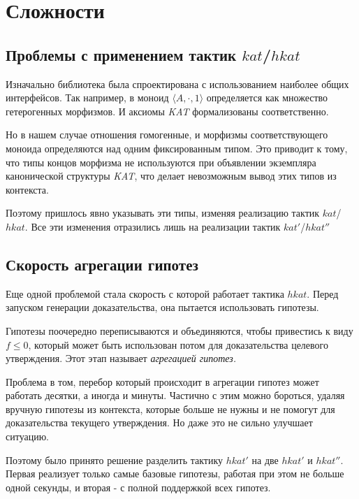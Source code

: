 \documentclass[times
              ]{itmo-student-thesis}
\begin{document}
  \section{Сложности}
    \subsection{Проблемы с применением тактик $kat$/$hkat$}
      Изначально библиотека была спроектирована с использованием наиболее общих интерфейсов.
      Так например, в моноид $ \langle A, \cdot, 1 \rangle $ определяется как множество гетерогенных морфизмов. И аксиомы \textit{KAT} формализованы соответственно.


      Но в нашем случае отношения гомогенные, и морфизмы соответствующего моноида определяются над одним фиксированным типом.
      Это приводит к тому, что типы концов морфизма не используются при объявлении экземпляра канонической структуры \textit{KAT},
      что делает невозможным вывод этих типов из контекста.

      Поэтому пришлось явно указывать эти типы, изменяя реализацию тактик $ kat $/$ hkat $.
      Все эти изменения отразились лишь на реализации тактик $ kat' $/$ hkat'' $

    \subsection{Скорость агрегации гипотез}

      Еще одной проблемой стала скорость с которой работает тактика $ hkat $.
      Перед запуском генерации доказательства, она пытается использовать гипотезы.

      Гипотезы поочередно переписываются и объединяются, чтобы привестись к виду $ f \leq 0 $, который может быть использован потом для доказательства целевого утверждения.
      Этот этап называет \textit{агрегацией гипотез.}

      Проблема в том, перебор который происходит в агрегации гипотез может работать десятки, а иногда и минуты.
      Частично с этим можно бороться, удаляя вручную гипотезы из контекста, которые больше не нужны и не помогут для доказательства текущего утверждения.
      Но даже это не сильно улучшает ситуацию.

      Поэтому было принято решение разделить тактику $ hkat' $ на две $ hkat' $ и $ hkat'' $.
      Первая реализует только самые базовые гипотезы, работая при этом не больше одной секунды, и вторая - с полной поддержкой всех гипотез.
\end{document}
